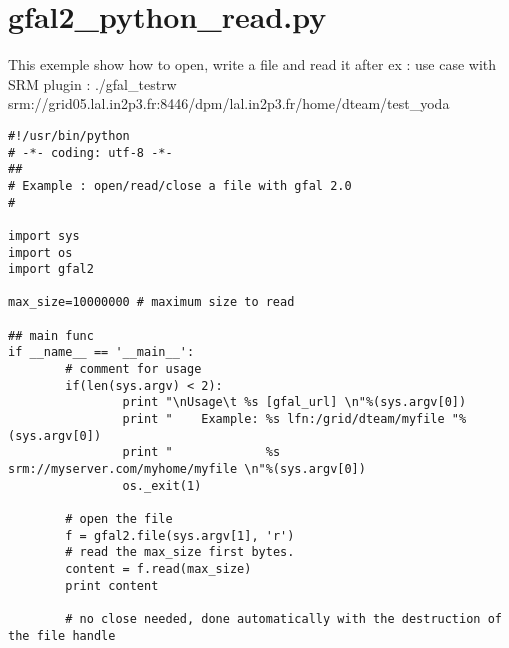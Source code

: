 \section{gfal2\_\-python\_\-read.py}
This exemple show how to open, write a file and read it after ex : use case with SRM plugin : ./gfal\_\-testrw srm://grid05.lal.in2p3.fr:8446/dpm/lal.in2p3.fr/home/dteam/test\_\-yoda



\begin{DocInclude}\begin{verbatim}#!/usr/bin/python
# -*- coding: utf-8 -*-
##
# Example : open/read/close a file with gfal 2.0
#

import sys
import os
import gfal2

max_size=10000000 # maximum size to read

## main func
if __name__ == '__main__':
        # comment for usage
        if(len(sys.argv) < 2):
                print "\nUsage\t %s [gfal_url] \n"%(sys.argv[0])
                print "    Example: %s lfn:/grid/dteam/myfile "%(sys.argv[0])
                print "             %s srm://myserver.com/myhome/myfile \n"%(sys.argv[0])
                os._exit(1)
                
        # open the file
        f = gfal2.file(sys.argv[1], 'r')
        # read the max_size first bytes.
        content = f.read(max_size)
        print content
        
        # no close needed, done automatically with the destruction of the file handle
\end{verbatim}
\end{DocInclude}
 